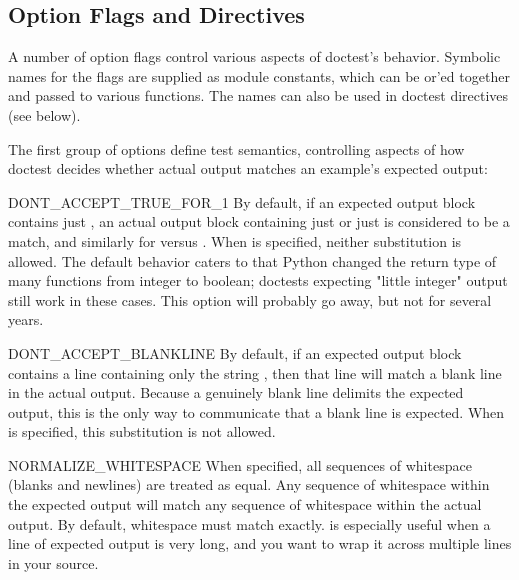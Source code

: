 

\subsection{Option Flags and Directives\label{doctest-options}}

A number of option flags control various aspects of doctest's
behavior.  Symbolic names for the flags are supplied as module constants,
which can be or'ed together and passed to various functions.  The names
can also be used in doctest directives (see below).

The first group of options define test semantics, controlling
aspects of how doctest decides whether actual output matches an
example's expected output:

\begin{datadesc}{DONT_ACCEPT_TRUE_FOR_1}
    By default, if an expected output block contains just ,
    an actual output block containing just  or just
     is considered to be a match, and similarly for 
    versus .  When  is
    specified, neither substitution is allowed.  The default behavior
    caters to that Python changed the return type of many functions
    from integer to boolean; doctests expecting "little integer"
    output still work in these cases.  This option will probably go
    away, but not for several years.
\end{datadesc}

\begin{datadesc}{DONT_ACCEPT_BLANKLINE}
    By default, if an expected output block contains a line
    containing only the string , then that line
    will match a blank line in the actual output.  Because a
    genuinely blank line delimits the expected output, this is
    the only way to communicate that a blank line is expected.  When
     is specified, this substitution
    is not allowed.
\end{datadesc}

\begin{datadesc}{NORMALIZE_WHITESPACE}
    When specified, all sequences of whitespace (blanks and newlines) are
    treated as equal.  Any sequence of whitespace within the expected
    output will match any sequence of whitespace within the actual output.
    By default, whitespace must match exactly.
     is especially useful when a line
    of expected output is very long, and you want to wrap it across
    multiple lines in your source.
\end{datadesc}

